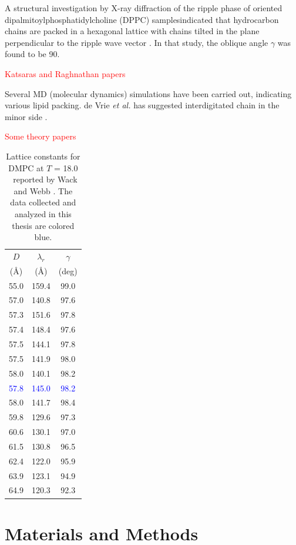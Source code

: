 A structural investigation by X-ray diffraction of the ripple phase of
oriented dipalmitoylphosphatidylcholine (DPPC) samplesindicated that
hydrocarbon chains are packed in a hexagonal lattice with chains
tilted in the plane perpendicular to the ripple wave vector \cite{ref:Hentschel91}.
In that study, the oblique angle $\gamma$ was found to be 90\textdegree.

\textcolor{red}{Katsaras and Raghnathan papers}

Several MD (molecular dynamics) simulations have been carried out, indicating
various lipid packing. de Vrie \textit{et al.} has suggested interdigitated chain in the
minor side \cite{ref:deVries05}.

\textcolor{red}{Some theory papers}

\begin{table}[htbp]
\centering
  \begin{tabular}{ccc}
    \hline
    $D$ & $\lambda_r$ & $\gamma$ \\
    (\AA) & (\AA) & (deg) \\
    \hline
    55.0 & 159.4 & 99.0 \\
    57.0 & 140.8 & 97.6 \\
    57.3 & 151.6 & 97.8 \\
    57.4 & 148.4 & 97.6 \\
    57.5	 & 144.1 & 97.8 \\
    57.5 & 141.9 & 98.0 \\
    58.0 & 140.1 & 98.2 \\
    \textcolor{blue}{57.8} & \textcolor{blue}{145.0} & \textcolor{blue}{98.2} \\
    58.0 & 141.7 & 98.4 \\
    59.8 & 129.6 & 97.3 \\
    60.6 & 130.1 & 97.0 \\
    61.5 & 130.8 & 96.5 \\
    62.4 & 122.0 & 95.9 \\
    63.9 & 123.1 & 94.9 \\
    64.9 & 120.3 & 92.3 \\    
    \hline 
  \end{tabular}
  \caption{Lattice constants for DMPC at $T$ = 18.0 \textcelsius\
  reported by Wack and Webb \cite{ref:Wack89}. The data collected and analyzed in this thesis
  are colored blue.} 
\end{table}

\section{Materials and Methods}
